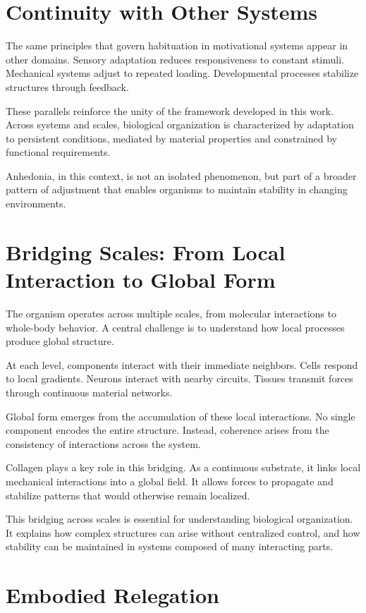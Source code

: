 \documentclass[11pt,oneside]{book}
\begin{document}
\section{Continuity with Other Systems}

The same principles that govern habituation in motivational systems appear in other domains. Sensory adaptation reduces responsiveness to constant stimuli. Mechanical systems adjust to repeated loading. Developmental processes stabilize structures through feedback.

These parallels reinforce the unity of the framework developed in this work. Across systems and scales, biological organization is characterized by adaptation to persistent conditions, mediated by material properties and constrained by functional requirements.

Anhedonia, in this context, is not an isolated phenomenon, but part of a broader pattern of adjustment that enables organisms to maintain stability in changing environments.

\section{Bridging Scales: From Local Interaction to Global Form}

The organism operates across multiple scales, from molecular interactions to whole-body behavior. A central challenge is to understand how local processes produce global structure.

At each level, components interact with their immediate neighbors. Cells respond to local gradients. Neurons interact with nearby circuits. Tissues transmit forces through continuous material networks.

Global form emerges from the accumulation of these local interactions. No single component encodes the entire structure. Instead, coherence arises from the consistency of interactions across the system.

Collagen plays a key role in this bridging. As a continuous substrate, it links local mechanical interactions into a global field. It allows forces to propagate and stabilize patterns that would otherwise remain localized.

This bridging across scales is essential for understanding biological organization. It explains how complex structures can arise without centralized control, and how stability can be maintained in systems composed of many interacting parts.

\section{Embodied Relegation}
\end{document}
